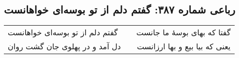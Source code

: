 \begin{center}
\section*{رباعی شماره ۳۸۷: گفتم دلم از تو بوسه‌ای خواهانست}
\label{sec:0387}
\begin{longtable}{l p{0.5cm} r}
گفتم دلم از تو بوسه‌ای خواهانست
&&
گفتا که بهای بوسهٔ ما جانست
\\
دل آمد و در پهلوی جان گشت روان
&&
یعنی که بیا بیع و بها ارزانست
\\
\end{longtable}
\end{center}
